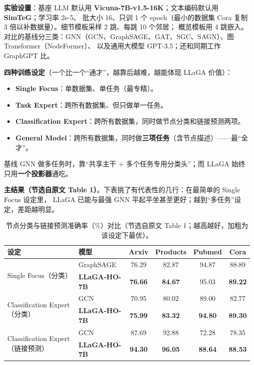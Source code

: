 \documentclass[11pt,UTF8,fontset=fandol]{ctexart}
\begin{document}
\textbf{实验设置}：基座 LLM 默认用 \textbf{Vicuna-7B-v1.5-16K}；文本编码默认用 \textbf{SimTeG}；学习率 2e-5、
批大小 16、只训 1 个 epoch（最小的数据集 Cora 复制 3 倍以补数据量）。细节模板采样 2 跳、每跳 10 个邻居；
概览模板用 4 跳嵌入。对比的基线分三类：GNN（GCN、GraphSAGE、GAT、SGC、SAGN）、图 Transformer（NodeFormer）、
以及通用大模型 GPT-3.5；还和同期工作 GraphGPT 比。

\textbf{四种训练设定}（一个比一个“通才”，越靠后越难，越能体现 LLaGA 价值）：
\begin{itemize}[leftmargin=2em]
  \item \textbf{Single Focus}：单数据集、单任务（最专精）。
  \item \textbf{Task Expert}：跨所有数据集、但只做单一任务。
  \item \textbf{Classification Expert}：跨所有数据集，同时做节点分类和链接预测两项。
  \item \textbf{General Model}：跨所有数据集，同时做\textbf{三项任务}（含节点描述）——最“全才”。
\end{itemize}
基线 GNN 做多任务时，靠“共享主干 + 多个任务专用分类头”；而 LLaGA 始终只用\textbf{一个投影器}通吃。

\textbf{主结果（节选自原文 Table 1）}。下表挑了有代表性的几行：在最简单的 Single Focus 设定里，
LLaGA 已能与最强 GNN 平起平坐甚至更好；越到“多任务”设定，差距越明显。

\begin{table}[H]\centering
\caption{节点分类与链接预测准确率（\%）对比（节选自原文 Table 1；越高越好，加粗为该设定下最优）。}
\begin{tabular}{llcccc}
\toprule
设定 & 模型 & Arxiv & Products & Pubmed & Cora \\
\midrule
\multirow{2}{*}{Single Focus（分类）}
 & GraphSAGE     & 76.29 & 82.87 & 94.87 & 88.89 \\
 & \textbf{LLaGA-HO-7B} & \textbf{76.66} & \textbf{84.67} & 95.03 & \textbf{89.22} \\
\midrule
\multirow{2}{*}{Classification Expert（分类）}
 & GCN           & 70.95 & 80.02 & 89.00 & 82.77 \\
 & \textbf{LLaGA-HO-7B} & \textbf{75.99} & \textbf{83.32} & \textbf{94.80} & \textbf{89.30} \\
\midrule
\multirow{2}{*}{Classification Expert（链接预测）}
 & GCN           & 87.69 & 92.88 & 72.28 & 78.35 \\
 & \textbf{LLaGA-HO-7B} & \textbf{94.30} & \textbf{96.05} & \textbf{88.64} & \textbf{88.53} \\
\bottomrule
\end{tabular}
\end{table}
\end{document}
